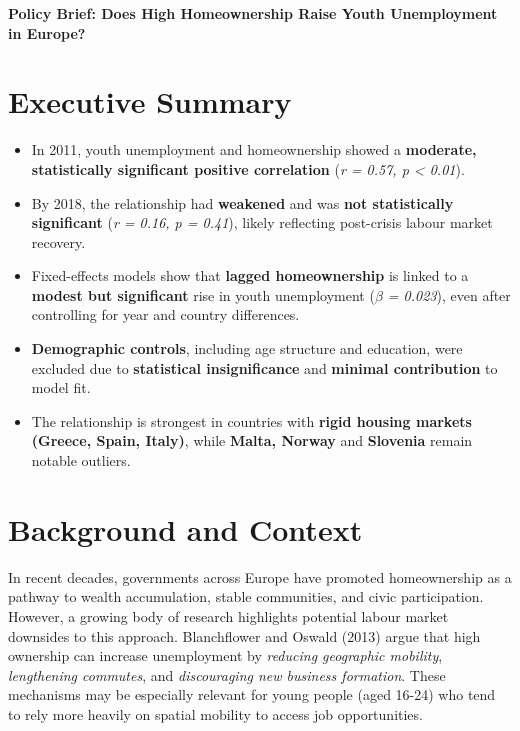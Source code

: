 \documentclass[11pt]{article}
\begin{document}
	
	\begin{center}
		\LARGE\textbf{Policy Brief: Does High Homeownership Raise Youth Unemployment in Europe?}
	\end{center}
	
	\begin{multicols}{2}
		
		\section*{Executive Summary}
		
		\vspace{-1em}
		
		\begin{tcolorbox}
			\begin{itemize}[left=0.3em, labelsep=0.5em, labelwidth=0.6em, itemsep=0pt, topsep=0pt]
				\item In 2011, youth unemployment and homeownership showed a \textbf{moderate, statistically significant positive correlation} (\textit{r = 0.57, p < 0.01}).
				\item By 2018, the relationship had \textbf{weakened} and was \textbf{not statistically significant} (\textit{r = 0.16, p = 0.41}), likely reflecting post-crisis labour market recovery.
				\item Fixed-effects models show that \textbf{lagged homeownership} is linked to a \textbf{modest but significant} rise in youth unemployment (\textit{$\beta$ = 0.023}), even after controlling for year and country differences.
				\item \textbf{Demographic controls}, including age structure and education, were excluded due to \textbf{statistical insignificance} and \textbf{minimal contribution} to model fit.
				\item The relationship is strongest in countries with \textbf{rigid housing markets}  \textbf{(Greece, Spain, Italy)}, while \textbf{Malta, Norway} and \textbf{Slovenia} remain notable outliers.
			\end{itemize}
		\end{tcolorbox}

		\section*{Background and Context}
		In recent decades, governments across Europe have promoted homeownership as a pathway to wealth accumulation, stable communities, and civic participation. However, a growing body of research highlights potential labour market downsides to this approach. Blanchflower and Oswald (2013) argue that high ownership can increase unemployment by \textit{reducing geographic mobility}, \textit{lengthening commutes}, and \textit{discouraging new business formation}. These mechanisms may be especially relevant for young people (aged 16-24) who tend to rely more heavily on spatial mobility to access job opportunities.
				

\end{multicols}
\end{document}
